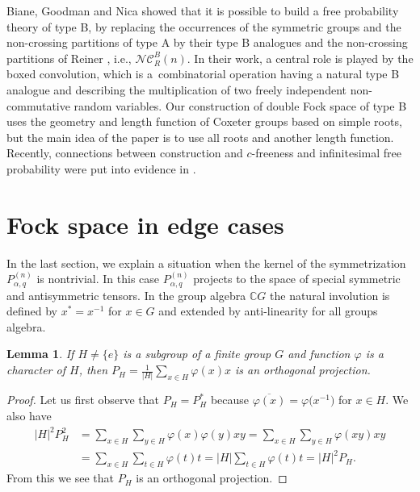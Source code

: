 \documentclass[pdftex]{sigma}
\numberwithin{equation}{section}
\newtheorem{Lemma}[Theorem]{Lemma}
\def\C{{\mathbb C}}
\def\NC{\mathcal{NC}}
\newcommand{\q}{q}
\newcommand{\s}{\alpha}%
\begin{document}
\begin{Remark}
Biane, Goodman and Nica \cite{BianeGoodmanNica2003} showed that it is possible to build a free probability theory of type B, by replacing the occurrences of the symmetric groups and the non-crossing partitions of type A by their type B analogues and the non-crossing partitions of Reiner \cite{Reiner1997}, i.e., $\NC^{B}_R(n)$. In their work,
a central role is played by the boxed convolution, which is a~combinatorial operation having a natural type B analogue and describing the multiplication of
two freely independent non-commutative random variables.
Our construction of double Fock space of type B
uses the geometry and length function of Coxeter groups based on simple roots, but
the main idea of the paper \cite{BianeGoodmanNica2003} is to use all roots and another length function. Recently,
connections between construction \cite{BianeGoodmanNica2003} and $c$-freeness and infinitesimal free probability were put into evidence in
\cite{BelinschiShlyakhtenko2012,CebronDahlqvistGabriel2022,CebronGilliers2022,Fevrier2012,EewierSzpojankowskiNicaMastnak2019,
Popa2010}.
\end{Remark}

\section{Fock space in edge cases}
In the last section, we explain a situation when
the kernel of the symmetrization $P_{\s,\q}^{(n)}$ is nontrivial.
In this case ${P_{\s,\q}^{(n)}}$ projects to the space of special symmetric and antisymmetric tensors. In the group algebra $\C G$ the natural involution is defined by $x^\ast=x^{-1}$ for $x\in G$ and extended by anti-linearity for all groups algebra.

\begin{Lemma}\label{lematprojektr}
If $H\neq\{e\}$ is a subgroup of a finite group $G$ and function $\varphi$ is a character of $H$, then
$P_H=\frac{1}{|H|}\sum_{x\in H}\varphi(x)x$ is an orthogonal projection.
\end{Lemma}
\begin{proof}
Let us first observe that $P_H=P_H^\ast$ because $\overline{\varphi(x)}=\varphi\big(x^{-1}\big)$ for $x\in H$. We also have
\begin{align*}
|H|^2P_H^2&=\sum_{x\in H}\sum_{y\in H}\varphi(x)\varphi(y)xy=\sum_{x\in H}\sum_{y\in H}\varphi(xy)xy
\\
&=\sum_{x\in H}\sum_{t\in H}\varphi(t)t=| H|\sum_{t\in H}\varphi(t)t=|H|^2P_H.
\end{align*}
From this we see that $P_H$ is an orthogonal projection.
\end{proof}
\end{document}

